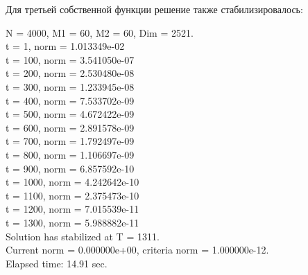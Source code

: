 \documentclass[12pt,a4paper]{article}
\begin{document}
Для третьей собственной функции решение также стабилизировалось:
\begin{center}
N = 4000, M1 =  60, M2 =  60, Dim =   2521.                   \\
t =   1, norm = 1.013349e-02                                  \\
t = 100, norm = 3.541050e-07                                  \\
t = 200, norm = 2.530480e-08                                  \\
t = 300, norm = 1.233945e-08                                  \\
t = 400, norm = 7.533702e-09                                  \\
t = 500, norm = 4.672422e-09                                  \\
t = 600, norm = 2.891578e-09                                  \\
t = 700, norm = 1.792497e-09                                  \\
t = 800, norm = 1.106697e-09                                  \\
t = 900, norm = 6.857592e-10                                  \\
t = 1000, norm = 4.242642e-10                                 \\
t = 1100, norm = 2.375473e-10                                 \\
t = 1200, norm = 7.015539e-11                                 \\
t = 1300, norm = 5.988882e-11                                 \\
Solution has stabilized at T = 1311.                          \\
Current norm = 0.000000e+00, criteria norm = 1.000000e-12.    \\
Elapsed time: 14.91 sec.
\end{center}
\end{document}
